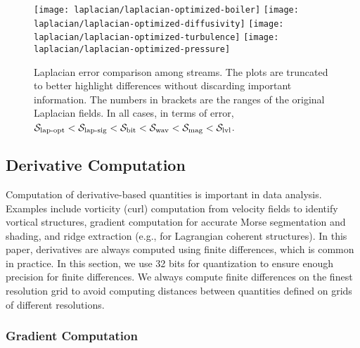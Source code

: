 \begin{figure*}[!t]
\centering
{}
{\texttt{[image: laplacian/laplacian-optimized-boiler]}\vspace{-0.5em}}
{\texttt{[image: laplacian/laplacian-optimized-diffusivity]}\vspace{-0.5em}}
{\texttt{[image: laplacian/laplacian-optimized-turbulence]}\vspace{-0.5em}}
{\texttt{[image: laplacian/laplacian-optimized-pressure]}\vspace{-0.5em}}
\vspace{-0.5em}
\caption{Laplacian error comparison among streams. The plots are truncated to better highlight
differences without discarding important information. The numbers in brackets are the ranges of the
original Laplacian fields. In all cases, in terms of error, $\slop <\slsg < \sbit < \swav < \smag <
\slvl$.}
\label{fig:laplacian-error-comparison}
\vspace{-1.5em}
\end{figure*}

\subsection{Derivative Computation} \label{sec:derivatives}

Computation of derivative-based quantities is important in data analysis. Examples include vorticity
(curl) computation from velocity fields to identify vortical structures, gradient computation for
accurate Morse segmentation and shading, and ridge extraction (e.g., for Lagrangian coherent
structures). In this paper, derivatives are always computed using finite differences, which is
common in practice. In this section, we use 32 bits for quantization to ensure enough precision for
finite differences. We always compute finite differences on the finest resolution grid to avoid
computing distances between quantities defined on grids of different resolutions.

\subsubsection{Gradient Computation} \label{sec:gradient}

